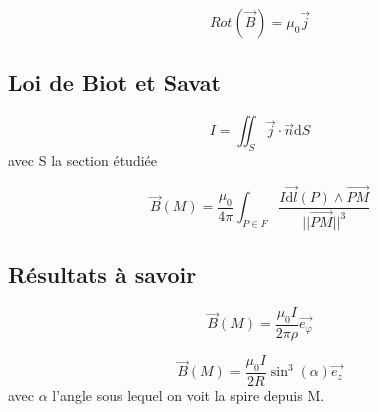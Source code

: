 \documentclass[french]{yLectureNote}
\renewcommand{\vec}{\overrightarrow}
\newcommand{\dd}{\mathrm{d}}
\newcommand{\norm}[1]{||\vec{#1}||}
\newcommand{\B}{\vec{B}(M)}
\begin{document}
\begin{theorem}
\[Rot(\vec{B})=\mu_0 \vec{j}\]
\end{theorem}
\subsection{Loi de Biot et Savat}
\begin{definition}
\[I = \iint_{S}\vec{j}\cdot \vec{n}\dd S\] avec S la section étudiée
\end{definition}
\begin{theorem}
 \[\B = \frac{\mu_0}{4\pi}  \int_{P\in F} \frac{I\vec{\dd l}(P)\wedge \vec{PM}}{\norm{PM}^3}\]
\end{theorem}
\subsection{Résultats à savoir}
\begin{proposition}
\[\vec{B}(M) = \frac{\mu_0 I}{2\pi \rho}\vec{e_{\varphi}}\]
\end{proposition}
\begin{proposition}
\[\B = \frac{\mu_0 I}{2R}\sin^3(\alpha)\vec{e_z}\] avec \(\alpha\) l'angle sous lequel on voit la spire depuis M.
\end{proposition}
 
\end{document}
